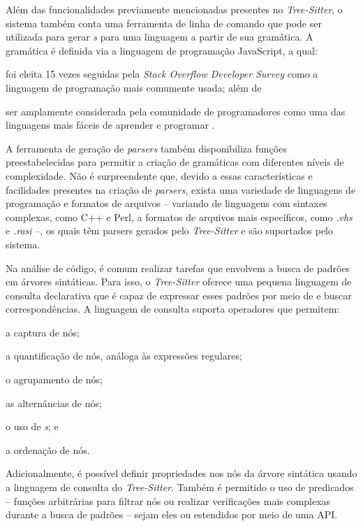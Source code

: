 \documentclass
  [11pt, a4paper, english, openright, sumario = tradicional, twoside, brazil]
  {abntex2}
\begin{document}
  Além das funcionalidades previamente mencionadas presentes no
  \textit{Tree-Sitter}, o sistema também conta uma ferramenta de linha de
  comando que pode ser utilizada para gerar \textit{s} para uma
  linguagem a partir de sua gramática. A gramática é definida via a linguagem
  de programação JavaScript, a qual:
  \begin{inparaenum}
    \item foi eleita 15 vezes seguidas pela
          \textit{Stack Overflow Developer Survey}
          \cite{stack-overflow-2022-stack} como a linguagem de programação mais
          comumente usada; além de
    \item ser amplamente considerada pela comunidade de programadores
          como uma das linguagens mais fáceis de aprender e programar
          \cites {berkeley-2023-11}{goel-2023-how}{w3schools-2023-javascript}.
  \end{inparaenum}
  A ferramenta de geração de \textit{parsers} também disponibiliza funções
  preestabelecidas para permitir a criação de gramáticas com diferentes níveis
  de complexidade. Não é surpreendente que, devido a essas características e
  facilidades presentes na criação de \textit{parsers}, exista uma variedade de
  linguagens de programação e formatos de arquivos -- variando de linguagens
  com sintaxes complexas, como C++ e Perl, a formatos de arquivos mais
  específicos, como \textit{.vhs} e \textit{.rasi} --, os quais têm parsers
  gerados pelo \textit{Tree-Sitter} e são suportados pelo sistema.

  Na análise de código, é comum realizar tarefas que envolvem a busca de
  padrões em árvores sintáticas. Para isso, o \textit{Tree-Sitter} oferece uma
  pequena linguagem de consulta declarativa que é capaz de expressar esses
  padrões por meio de \textit{} e buscar correspondências. A
  linguagem de consulta suporta operadores que permitem:
  \begin{inparaenum}
    \item a captura de nós;
    \item a quantificação de nós, análoga às expressões regulares;
    \item o agrupamento de nós;
    \item as alternâncias de nós;
    \item o uso de \textit{s}; e
    \item a ordenação de nós.
  \end{inparaenum}
  Adicionalmente, é possível definir propriedades nos nós da árvore sintática
  usando a linguagem de consulta do \textit{Tree-Sitter}. Também é permitido o
  uso de predicados -- funções arbitrárias para filtrar nós ou realizar
  verificações mais complexas durante a busca de padrões -- sejam eles
  \textit{} ou estendidos por meio de uma API.
\end{document}
